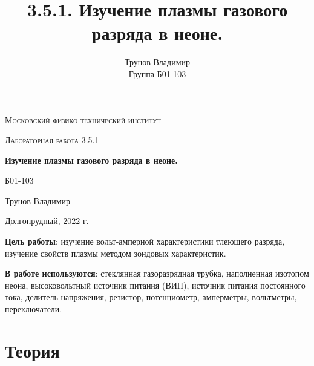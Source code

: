\documentclass[a4paper,12pt]{article}
\author{Трунов Владимир\\
Группа Б01-103}
\title{3.5.1. Изучение плазмы газового разряда в неоне.}
\date{}
\begin{document}
\begin{titlepage}
	\centering
	\vspace{5cm}
	{\scshape\LARGE Московский физико-технический институт \par}
	\vspace{4cm}
	{\scshape\Large Лабораторная работа 3.5.1 \par}
	\vspace{1cm}
	{\huge\bfseries Изучение плазмы газового разряда в неоне. \par}
	\vspace{7cm}
	\vfill
\begin{flushright}
	{\large Б01-103}\par
	\vspace{0.3cm}
	{\LARGE Трунов Владимир}
\end{flushright}
	

	\vfill

	Долгопрудный, 2022 г.
\end{titlepage}

\textbf{Цель работы}: изучение вольт-амперной характеристики тлеющего разряда, изучение свойств плазмы методом зондовых характеристик.


\textbf{В работе используются}: стеклянная газоразрядная трубка, наполненная изотопом неона, высоковольтный источник питания (ВИП), источник питания постоянного тока, делитель напряжения, резистор, потенциометр, амперметры, вольтметры, переключатели.
\section*{Теория}
\end{document}
